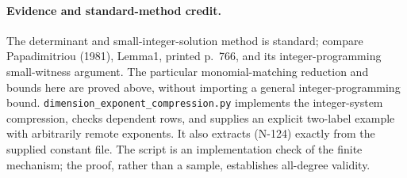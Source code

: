 \paragraph{Evidence and standard-method credit.}
The determinant and small-integer-solution method is standard;
compare Papadimitriou (1981), Lemma1, printed p.~766, and its
integer-programming small-witness argument.  The particular
monomial-matching reduction and bounds here are proved above,
without importing a general integer-programming bound.
\nolinkurl{dimension_exponent_compression.py} implements the
integer-system compression, checks dependent rows, and supplies
an explicit two-label example with arbitrarily remote exponents.
It also extracts (N-124) exactly from the supplied constant file.
The script is an implementation check of the finite mechanism;
the proof, rather than a sample, establishes all-degree validity.
